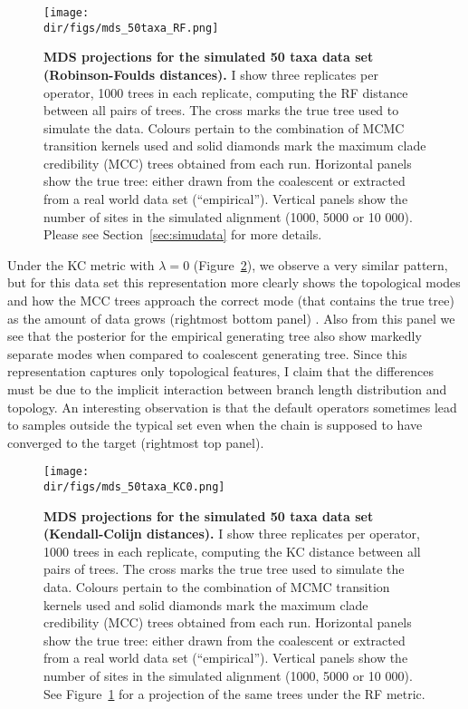 \begin{figure}[!ht]
\begin{center}
\texttt{[image: \\dir/figs/mds\_50taxa\_RF.png]} 
\end{center}
 \caption[MDS projections for the simulated 50 taxa data set (Robinson-Foulds distances).]{\textbf{MDS projections for the simulated 50 taxa data set (Robinson-Foulds distances).}
  I show three replicates per operator, 1000 trees in each replicate, computing the RF distance between all pairs of trees.
  The cross marks the true tree used to simulate the data.
 Colours pertain to the combination of MCMC transition kernels used and solid diamonds mark the maximum clade credibility (MCC) trees obtained from each run.
 Horizontal panels show the true tree: either drawn from the coalescent or extracted from a real world data set (``empirical'').
 Vertical panels show the number of sites in the simulated alignment (1000, 5000 or 10 000).
 Please see Section~\ref{sec:simudata} for more details.
 }
 \label{fig:mds_50taxa_RF}
\end{figure}

Under the KC metric with $\lambda = 0$ (Figure~\ref{fig:mds_50taxa_KC0}), we observe a very similar pattern, but for this data set this representation more clearly shows the topological modes and how the MCC trees approach the correct mode (that contains the true tree) as the amount of data grows (rightmost bottom panel) .
Also from this panel we see that the posterior for the empirical generating tree also show markedly separate modes when compared to coalescent generating tree.
Since this representation captures only topological features, I claim that the differences must be due to the implicit interaction between branch length distribution and topology. 
An interesting observation is that the default operators sometimes lead to samples outside the typical set even when the chain is supposed to have converged to the target (rightmost top panel).
\begin{figure}[!ht]
\begin{center}
\texttt{[image: \\dir/figs/mds\_50taxa\_KC0.png]} 
\end{center}
 \caption[MDS projections for the simulated 50 taxa data set (Kendall-Colijn distances).]{\textbf{MDS projections for the simulated 50 taxa data set (Kendall-Colijn distances).}
  I show three replicates per operator, 1000 trees in each replicate, computing the KC distance between all pairs of trees.
 The cross marks the true tree used to simulate the data.
 Colours pertain to the combination of MCMC transition kernels used and solid diamonds mark the maximum clade credibility (MCC) trees obtained from each run.
 Horizontal panels show the true tree: either drawn from the coalescent or extracted from a real world data set (``empirical'').
 Vertical panels show the number of sites in the simulated alignment (1000, 5000 or 10 000).
 See Figure~\ref{fig:mds_50taxa_RF} for a projection of the same trees under the RF metric.
 }
\label{fig:mds_50taxa_KC0}
\end{figure}

